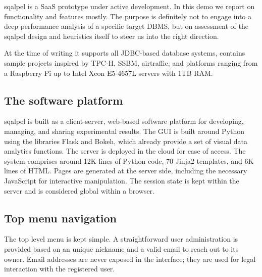 \documentclass{cidr-2019}
\begin{document}
 
{\sc sqalpel} is a SaaS prototype under active
development. In this demo we
report on functionality and features mostly. The purpose is definitely
not to engage into a deep performance analysis of a specific target
DBMS, but on assessment of the {\sc sqalpel} design and heuristics
itself to steer us into the right direction.

At the time of writing it supports all JDBC-based database systems,
contains sample projects inspired by TPC-H, SSBM, airtraffic, and
platforms ranging from a Raspberry Pi up to Intel Xeon E5-4657L
servers with 1TB RAM.


\subsection{The software platform}\label{GUI}
{\sc sqalpel}
 is built as a client-server, web-based software platform
for developing, managing, and sharing experimental results. The GUI is
built around Python using the libraries Flask and Bokeh, which already
provide a set of visual data analytics functions. The server is
deployed in the cloud for ease of access. The system comprises around
12K lines of Python code, 70 Jinja2 templates, and 6K lines of HTML.
Pages are generated at the server side, including the necessary
JavaScript for interactive manipulation.
The session state is kept within the server and is considered global
within a browser.

\subsection{Top menu navigation}
The top level menu is kept simple. A straightforward user
administration is provided based on an unique nickname and a valid
email to reach out to its owner. Email addresses are never exposed in the interface; they
are used for legal interaction with the registered user.
\end{document}

